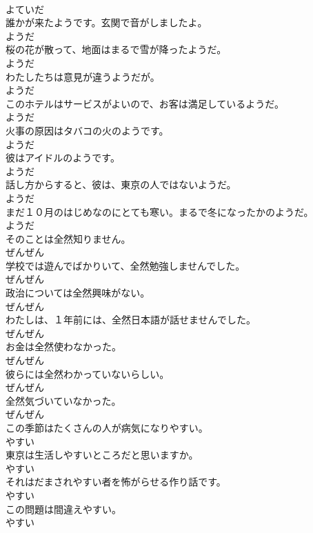 \documentclass[8pt]{extreport}
\begin{document}
\begin{CJK}{UTF8}{min}
\\	よていだ
\\	誰かが来たようです。玄関で音がしましたよ。	
\\	ようだ
\\	桜の花が散って、地面はまるで雪が降ったようだ。	
\\	ようだ
\\	わたしたちは意見が違うようだが。	
\\	ようだ
\\	このホテルはサービスがよいので、お客は満足しているようだ。	
\\	ようだ
\\	火事の原因はタバコの火のようです。	
\\	ようだ
\\	彼はアイドルのようです。	
\\	ようだ
\\	話し方からすると、彼は、東京の人ではないようだ。	
\\	ようだ
\\	まだ１０月のはじめなのにとても寒い。まるで冬になったかのようだ。	
\\	ようだ
\\	そのことは全然知りません。	
\\	ぜんぜん
\\	学校では遊んでばかりいて、全然勉強しませんでした。	
\\	ぜんぜん
\\	政治については全然興味がない。	
\\	ぜんぜん
\\	わたしは、１年前には、全然日本語が話せませんでした。	
\\	ぜんぜん
\\	お金は全然使わなかった。	
\\	ぜんぜん
\\	彼らには全然わかっていないらしい。	
\\	ぜんぜん
\\	全然気づいていなかった。	
\\	ぜんぜん
\\	この季節はたくさんの人が病気になりやすい。	
\\	やすい
\\	東京は生活しやすいところだと思いますか。	
\\	やすい
\\	それはだまされやすい者を怖がらせる作り話です。	
\\	やすい
\\	この問題は間違えやすい。	
\\	やすい

\end{CJK}
\end{document}

